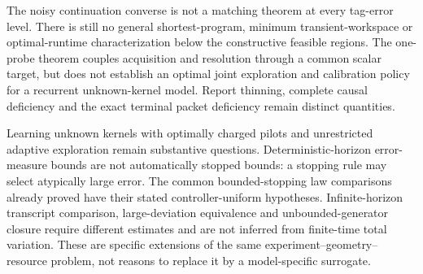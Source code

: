 The noisy continuation converse is not a matching theorem at every tag-error level. There is still no general shortest-program, minimum transient-workspace or optimal-runtime characterization below the constructive feasible regions. The one-probe theorem couples acquisition and resolution through a common scalar target, but does not establish an optimal joint exploration and calibration policy for a recurrent unknown-kernel model. Report thinning, complete causal deficiency and the exact terminal packet deficiency remain distinct quantities.

Learning unknown kernels with optimally charged pilots and unrestricted adaptive exploration remain substantive questions. Deterministic-horizon error-measure bounds are not automatically stopped bounds: a stopping rule may select atypically large error. The common bounded-stopping law comparisons already proved have their stated controller-uniform hypotheses. Infinite-horizon transcript comparison, large-deviation equivalence and unbounded-generator closure require different estimates and are not inferred from finite-time total variation. These are specific extensions of the same experiment--geometry--resource problem, not reasons to replace it by a model-specific surrogate.
